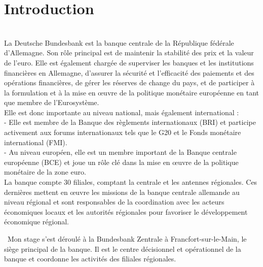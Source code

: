 \section*{Introduction} 
{}
\thispagestyle{noTitledHeader}
~\\
La Deutsche Bundesbank est la banque centrale de la République fédérale d'Allemagne. 
Son rôle principal est de maintenir la stabilité des prix et la valeur de l'euro. 
Elle est également chargée de superviser les banques et les institutions financières en Allemagne, 
d'assurer la sécurité et l'efficacité des paiements et des opérations financières, 
de gérer les réserves de change du pays, 
et de participer à la formulation et à la mise en œuvre de la politique monétaire européenne en tant que membre de l'Eurosystème.
\\

Elle est donc importante au niveau national, mais également international : 
\\
- Elle est membre de la Banque des règlements internationaux (BRI) et participe activement aux forums internationaux tels que le G20 et le Fonds monétaire international (FMI). 
\\
- Au niveau européen, elle est un membre important de la Banque centrale européenne (BCE) et joue un rôle clé dans la mise en œuvre de la politique monétaire de la zone euro. 
\\

La banque compte 30 filiales, comptant la centrale et les antennes régionales.
Ces dernières mettent en œuvre les missions de la banque centrale allemande au niveau régional et sont responsables de la coordination avec les acteurs économiques locaux et les autorités régionales pour favoriser le développement économique régional.

~Mon stage s'est déroulé à la Bundesbank Zentrale à Francfort-sur-le-Main, le siège principal de la banque. 
Il est le centre décisionnel et opérationnel de la banque et coordonne les activités des filiales régionales.
\\


